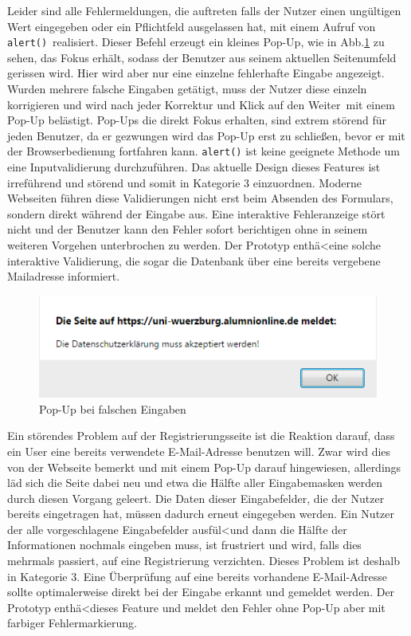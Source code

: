 { Leider sind alle Fehlermeldungen, die auftreten falls der Nutzer einen ungültigen Wert eingegeben oder ein Pflichtfeld ausgelassen hat, mit einem Aufruf von \glqq \texttt{alert()}\grqq ~realisiert. Dieser Befehl erzeugt ein kleines Pop-Up, wie in Abb.\ref{fig:regpopup} zu sehen, das Fokus erhält, sodass der Benutzer aus seinem aktuellen Seitenumfeld gerissen wird. Hier wird aber nur eine einzelne fehlerhafte Eingabe angezeigt. Wurden mehrere falsche Eingaben getätigt, muss der Nutzer diese einzeln korrigieren und wird nach jeder Korrektur und Klick auf den \glqq Weiter\grqq ~mit einem Pop-Up belästigt.
}
{ Pop-Ups die direkt Fokus erhalten, sind extrem störend für jeden Benutzer, da er gezwungen wird das Pop-Up erst zu schließen, bevor er mit der Browserbedienung fortfahren kann. \texttt{alert()} ist keine geeignete Methode um eine Inputvalidierung durchzuführen. Das aktuelle Design dieses Features ist irreführend und störend und somit in Kategorie 3 einzuordnen.
}
{ Moderne Webseiten führen diese Validierungen nicht erst beim Absenden des Formulars, sondern direkt während der Eingabe aus. Eine interaktive Fehleranzeige stört nicht und der Benutzer kann den Fehler sofort berichtigen ohne in seinem weiteren Vorgehen unterbrochen zu werden. Der Prototyp enthä\textless eine solche interaktive Validierung, die sogar die Datenbank über eine bereits vergebene Mailadresse informiert.
}
\begin{figure}
	\centering
		\includegraphics{figures/regpopup.png}
	\caption{Pop-Up bei falschen Eingaben}
	\label{fig:regpopup}
\end{figure}

{ Ein störendes Problem auf der Registrierungsseite ist die Reaktion darauf, dass ein User eine bereits verwendete E-Mail-Adresse benutzen will. Zwar wird dies von der Webseite bemerkt und mit einem Pop-Up darauf hingewiesen, allerdings läd sich die Seite dabei neu und etwa die Hälfte aller Eingabemasken werden durch diesen Vorgang geleert. Die Daten dieser Eingabefelder, die der Nutzer bereits eingetragen hat, müssen dadurch erneut eingegeben werden.
}
{ Ein Nutzer der alle vorgeschlagene Eingabefelder ausfül\textless und dann die Hälfte der Informationen nochmals eingeben muss, ist frustriert und wird, falls dies mehrmals passiert, auf eine Registrierung verzichten. Dieses Problem ist deshalb in Kategorie 3.
}
{ Eine Überprüfung auf eine bereits vorhandene E-Mail-Adresse sollte optimalerweise direkt bei der Eingabe erkannt und gemeldet werden. Der Prototyp enthä\textless dieses Feature und meldet den Fehler ohne Pop-Up aber mit farbiger Fehlermarkierung.
}  

